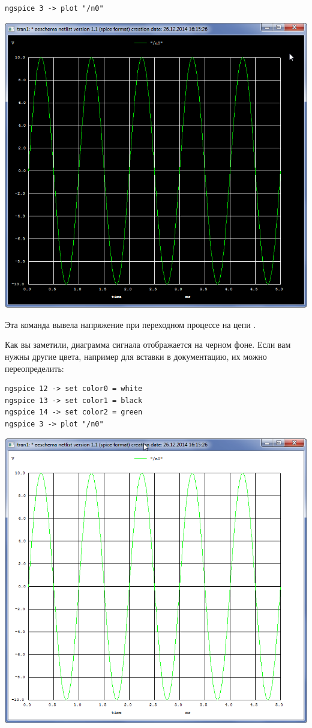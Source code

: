 \begin{verbatim}
ngspice 3 -> plot "/n0"
\end{verbatim}

\clearpage
\noindent\includegraphics[height=\textheight]{spice/spice1.png}
\clearpage

Эта команда вывела напряжение при переходном процессе на цепи .

Как вы заметили, диаграмма сигнала отображается на черном фоне. Если вам нужны
другие цвета, например для вставки в документацию, их можно переопределить:

\begin{verbatim}
ngspice 12 -> set color0 = white
ngspice 13 -> set color1 = black
ngspice 14 -> set color2 = green
ngspice 3 -> plot "/n0"
\end{verbatim}

\noindent\includegraphics[height=0.5\textheight]{spice/spice2.png}

